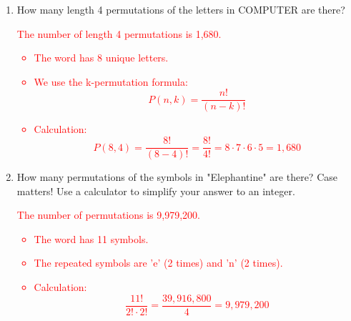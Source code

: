 \documentclass{article}
\begin{document}
\begin{enumerate}
    \item How many length 4 permutations of the letters in COMPUTER are there?
    \par
    \textcolor{red}{The number of length 4 permutations is 1,680.
    \begin{itemize}
        \item The word has 8 unique letters.
        \item We use the k-permutation formula:
        \[
        P(n,k) = \frac{n!}{(n-k)!}
        \]
        \item Calculation:
        \[
        P(8,4) = \frac{8!}{(8-4)!} = \frac{8!}{4!} = 8 \cdot 7 \cdot 6 \cdot 5 = 1,680
        \]
    \end{itemize}}

    \item How many permutations of the symbols in "Elephantine" are there? Case matters! Use a calculator to simplify your answer to an integer.
    \par
    \textcolor{red}{The number of permutations is 9,979,200.
    \begin{itemize}
        \item The word has 11 symbols.
        \item The repeated symbols are 'e' (2 times) and 'n' (2 times).
        \item Calculation:
        \[
        \frac{11!}{2! \cdot 2!} = \frac{39,916,800}{4} = 9,979,200
        \]
    \end{itemize}}
\end{enumerate}
\end{document}
